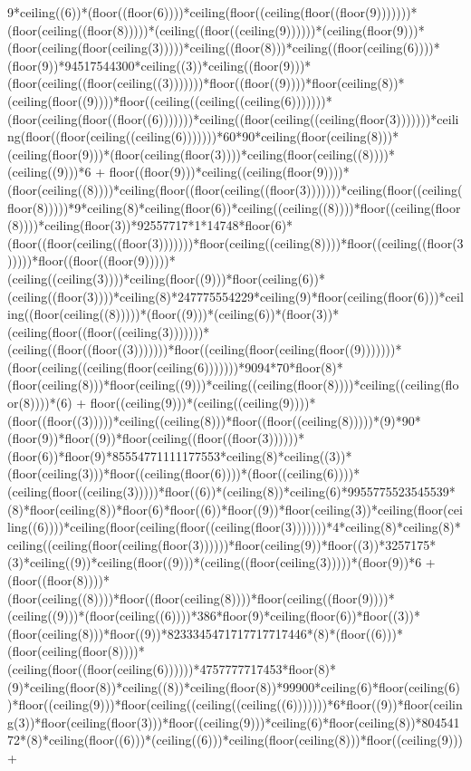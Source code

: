 9*ceiling((6))*(floor((floor(6))))*ceiling(floor((ceiling(floor((floor(9)))))))*(floor(ceiling((floor(8)))))*(ceiling((floor((ceiling(9))))))*(ceiling(floor(9)))*(floor(ceiling(floor(ceiling(3)))))*ceiling((floor(8)))*ceiling((floor(ceiling(6))))*(floor(9))*94517544300*ceiling((3))*ceiling((floor(9)))*(floor(ceiling((floor(ceiling((3)))))))*floor((floor((9))))*floor(ceiling(8))*(ceiling(floor((9))))*floor((ceiling((ceiling((ceiling(6)))))))*(floor(ceiling(floor((floor((6)))))))*ceiling((floor(ceiling((ceiling(floor(3)))))))*ceiling(floor((floor(ceiling((ceiling(6)))))))*60*90*ceiling(floor(ceiling(8)))*(ceiling(floor(9)))*(floor(ceiling(floor(3))))*ceiling(floor(ceiling((8))))*(ceiling((9)))*6 + floor((floor(9)))*ceiling((ceiling(floor(9))))*(floor(ceiling((8))))*ceiling(floor((floor(ceiling((floor(3)))))))*ceiling(floor((ceiling(floor(8)))))*9*ceiling(8)*ceiling(floor(6))*ceiling((ceiling((8))))*floor((ceiling(floor(8))))*ceiling(floor(3))*92557717*1*14748*floor(6)*(floor((floor(ceiling((floor(3)))))))*floor(ceiling((ceiling(8))))*floor((ceiling((floor(3)))))*floor((floor((floor(9)))))*(ceiling((ceiling(3))))*ceiling(floor((9)))*floor(ceiling(6))*(ceiling((floor(3))))*ceiling(8)*247775554229*ceiling(9)*floor(ceiling(floor(6)))*ceiling((floor(ceiling((8)))))*(floor((9)))*(ceiling(6))*(floor(3))*(ceiling(floor((floor((ceiling(3)))))))*(ceiling((floor((floor((3)))))))*floor((ceiling(floor(ceiling(floor((9)))))))*(floor(ceiling((ceiling(floor(ceiling(6)))))))*9094*70*floor(8)*(floor(ceiling(8)))*floor(ceiling((9)))*ceiling((ceiling(floor(8))))*ceiling((ceiling(floor(8))))*(6) + floor((ceiling(9)))*(ceiling((ceiling(9))))*(floor((floor((3)))))*ceiling((ceiling(8)))*floor((floor((ceiling(8)))))*(9)*90*(floor(9))*floor((9))*floor(ceiling((floor((floor(3))))))*(floor(6))*floor(9)*85554771111177553*ceiling(8)*ceiling((3))*(floor(ceiling(3)))*floor((ceiling(floor(6))))*(floor((ceiling(6))))*(ceiling(floor((ceiling(3)))))*floor((6))*(ceiling(8))*ceiling(6)*9955775523545539*(8)*floor(ceiling(8))*floor(6)*floor((6))*floor((9))*floor(ceiling(3))*ceiling(floor(ceiling((6))))*ceiling(floor(ceiling(floor((ceiling(floor(3)))))))*4*ceiling(8)*ceiling(8)*ceiling((ceiling(floor(ceiling(floor(3))))))*floor(ceiling(9))*floor((3))*3257175*(3)*ceiling((9))*ceiling(floor((9)))*(ceiling((floor(ceiling(3)))))*(floor(9))*6 + (floor((floor(8))))*(floor(ceiling((8))))*floor((floor(ceiling(8))))*floor(ceiling((floor(9))))*(ceiling((9)))*(floor(ceiling((6))))*386*floor(9)*ceiling(floor(6))*floor((3))*(floor(ceiling(8)))*floor((9))*8233345471717717717446*(8)*(floor((6)))*(floor(ceiling(floor(8))))*(ceiling(floor((floor(ceiling(6))))))*4757777717453*floor(8)*(9)*ceiling(floor(8))*ceiling((8))*ceiling(floor(8))*99900*ceiling(6)*floor(ceiling(6))*floor((ceiling(9)))*floor(ceiling((ceiling((ceiling((6)))))))*6*floor((9))*floor(ceiling(3))*floor(ceiling(floor(3)))*floor((ceiling(9)))*ceiling(6)*floor(ceiling(8))*80454172*(8)*ceiling(floor((6)))*(ceiling((6)))*ceiling(floor(ceiling(8)))*floor((ceiling(9))) + 
